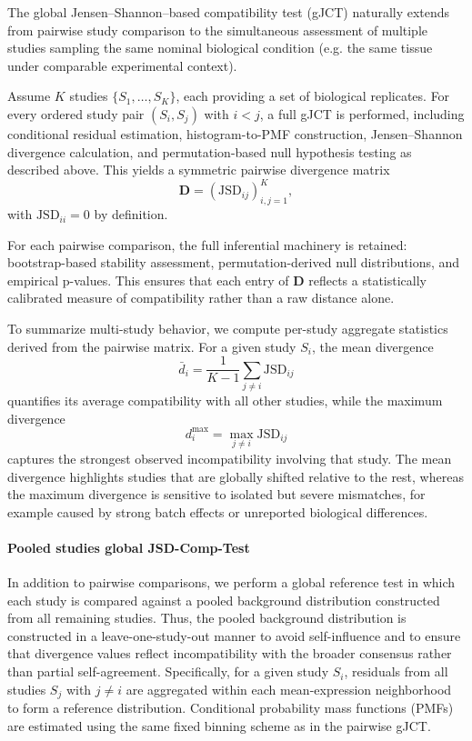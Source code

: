 The global Jensen--Shannon–based compatibility test (gJCT) naturally extends from pairwise study comparison to the simultaneous assessment of multiple studies sampling the same nominal biological condition (e.g. the same tissue under comparable experimental context).

Assume $K$ studies $\{S_1, \ldots, S_K\}$, each providing a set of biological replicates. For every ordered study pair $(S_i, S_j)$ with $i < j$, a full gJCT is performed, including conditional residual estimation, histogram-to-PMF construction, Jensen--Shannon divergence calculation, and permutation-based null hypothesis testing as described above. This yields a symmetric pairwise divergence matrix
\[
\mathbf{D} = (\mathrm{JSD}_{ij})_{i,j=1}^K,
\]
with $\mathrm{JSD}_{ii} = 0$ by definition.

For each pairwise comparison, the full inferential machinery is retained: bootstrap-based stability assessment, permutation-derived null distributions, and empirical p-values. This ensures that each entry of $\mathbf{D}$ reflects a statistically calibrated measure of compatibility rather than a raw distance alone.

To summarize multi-study behavior, we compute per-study aggregate statistics derived from the pairwise matrix. For a given study $S_i$, the mean divergence
\[
\bar{d}_i = \frac{1}{K-1} \sum_{j \ne i} \mathrm{JSD}_{ij}
\]
quantifies its average compatibility with all other studies, while the maximum divergence
\[
d^{\max}_i = \max_{j \ne i} \mathrm{JSD}_{ij}
\]
captures the strongest observed incompatibility involving that study. The mean divergence highlights studies that are globally shifted relative to the rest, whereas the maximum divergence is sensitive to isolated but severe mismatches, for example caused by strong batch effects or unreported biological differences.

\paragraph{Pooled studies global JSD-Comp-Test}

In addition to pairwise comparisons, we perform a global reference test in which each study is compared against a pooled background distribution constructed from all remaining studies. Thus, the pooled background distribution is constructed in a leave-one-study-out manner to avoid self-influence and to ensure that divergence values reflect incompatibility with the broader consensus rather than partial self-agreement. Specifically, for a given study $S_i$, residuals from all studies $S_j$ with $j \neq i$ are aggregated within each mean-expression neighborhood to form a reference distribution. Conditional probability mass functions (PMFs) are estimated using the same fixed binning scheme as in the pairwise gJCT.

